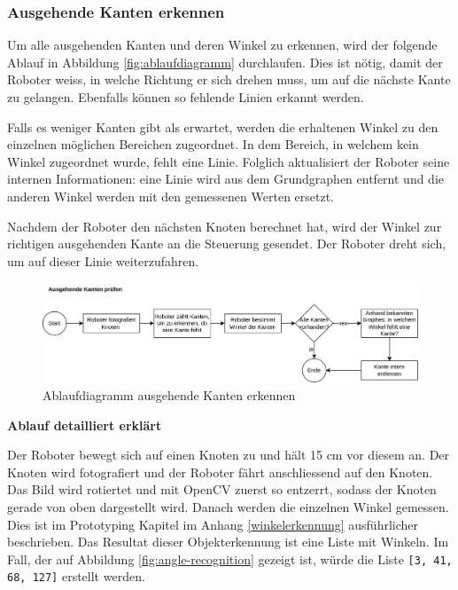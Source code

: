 \subsubsection{Ausgehende Kanten erkennen}\label{outgoing-angles}

Um alle ausgehenden Kanten und deren Winkel zu erkennen, wird der folgende Ablauf in Abbildung \ref{fig:ablaufdiagramm} durchlaufen. Dies ist nötig, damit der Roboter weiss, in welche Richtung er sich drehen muss, um auf die nächste Kante zu gelangen. Ebenfalls können so fehlende Linien erkannt werden.

Falls es weniger Kanten gibt als erwartet, werden die erhaltenen Winkel zu den einzelnen möglichen Bereichen zugeordnet. In dem Bereich, in welchem kein Winkel zugeordnet wurde, fehlt eine Linie. Folglich aktualisiert der Roboter seine internen Informationen: eine Linie wird aus dem Grundgraphen entfernt und die anderen Winkel werden mit den gemessenen Werten ersetzt.

Nachdem der Roboter den nächsten Knoten berechnet hat, wird der Winkel zur richtigen ausgehenden Kante an die Steuerung gesendet. Der Roboter dreht sich, um auf dieser Linie weiterzufahren.

\begin{figure}[H]
\centering
\includegraphics[width=\textwidth]{assets/gesamtkonzept/ablaufdiagramm-kanten-erkennen.png}
\caption{Ablaufdiagramm ausgehende Kanten erkennen}
\label{fig:ablaufdiagramm-kanten-erkennen}
\end{figure}

\textbf{Ablauf detailliert erklärt}

Der Roboter bewegt sich auf einen Knoten zu und hält 15 cm vor diesem an. Der Knoten wird fotografiert und der Roboter fährt anschliessend auf den Knoten. Das Bild wird rotiertet und mit OpenCV zuerst so entzerrt, sodass der Knoten gerade von oben dargestellt wird. Danach werden die einzelnen Winkel gemessen. Dies ist im Prototyping Kapitel im Anhang \ref{winkelerkennung} ausführlicher beschrieben. Das Resultat dieser Objekterkennung ist eine Liste mit Winkeln. Im Fall, der auf Abbildung \ref{fig:angle-recognition} gezeigt ist, würde die Liste \verb|[3, 41, 68, 127]| erstellt werden.

